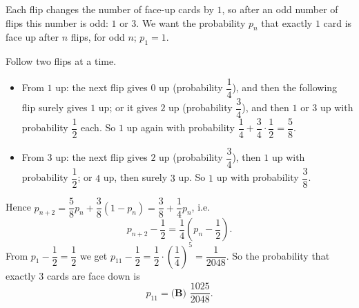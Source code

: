 Each flip changes the number of face-up cards by $1$, so after an odd number of flips this number is odd: $1$ or $3$. We want the probability $p_n$ that exactly $1$ card is face up after $n$ flips, for odd $n$; $p_1=1$.

Follow two flips at a time.
\begin{itemize}
\item From $1$ up: the next flip gives $0$ up (probability $\dfrac14$), and then the following flip surely gives $1$ up; or it gives $2$ up (probability $\dfrac34$), and then $1$ or $3$ up with probability $\dfrac12$ each. So $1$ up again with probability $\dfrac14+\dfrac34\cdot\dfrac12=\dfrac58$.
\item From $3$ up: the next flip gives $2$ up (probability $\dfrac34$), then $1$ up with probability $\dfrac12$; or $4$ up, then surely $3$ up. So $1$ up with probability $\dfrac38$.
\end{itemize}
Hence $p_{n+2}=\dfrac58p_n+\dfrac38(1-p_n)=\dfrac38+\dfrac14p_n$, i.e.
\[p_{n+2}-\dfrac12=\dfrac14\left(p_n-\dfrac12\right).\]
From $p_1-\dfrac12=\dfrac12$ we get $p_{11}-\dfrac12=\dfrac12\cdot\left(\dfrac14\right)^5=\dfrac1{2048}$. So the probability that exactly $3$ cards are face down is
\[p_{11}=\boxed{\textbf{(B) }\dfrac{1025}{2048}}.\]
